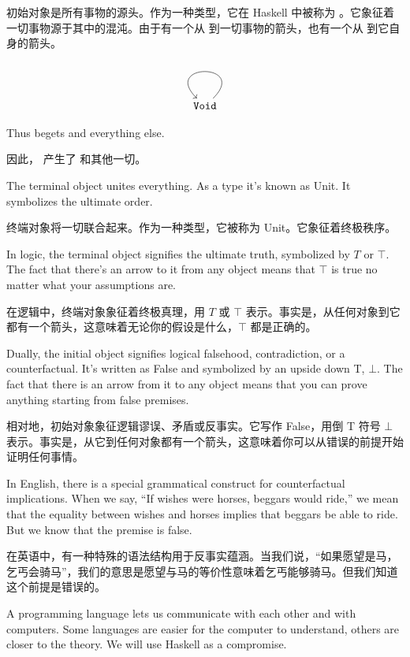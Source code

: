 \documentclass[DaoFP]{subfiles}
\begin{document}
 初始对象是所有事物的源头。作为一种类型，它在 Haskell 中被称为 。它象征着一切事物源于其中的混沌。由于有一个从  到一切事物的箭头，也有一个从  到它自身的箭头。

 \[
  \begin{tikzcd}
   \hask{Void}
   \arrow[loop]
  \end{tikzcd}
 \]

 Thus  begets  and everything else.

 因此， 产生了  和其他一切。

 The terminal object unites everything. As a type it's known as Unit. It symbolizes the ultimate order.

 终端对象将一切联合起来。作为一种类型，它被称为 Unit。它象征着终极秩序。

 In logic, the terminal object signifies the ultimate truth, symbolized by $T$ or $ \top$. The fact that there's an arrow to it from any object means that $ \top$ is true no matter what your assumptions are.

 在逻辑中，终端对象象征着终极真理，用 $T$ 或 $ \top$ 表示。事实是，从任何对象到它都有一个箭头，这意味着无论你的假设是什么，$ \top$ 都是正确的。

 Dually, the initial object signifies logical falsehood, contradiction, or a counterfactual. It's written as  False and symbolized by an upside down T, $ \bot$. The fact that there is an arrow from it to any object means that you can prove anything starting from false premises.

 相对地，初始对象象征逻辑谬误、矛盾或反事实。它写作 False，用倒 T 符号 $ \bot$ 表示。事实是，从它到任何对象都有一个箭头，这意味着你可以从错误的前提开始证明任何事情。

 In English, there is a special grammatical construct for counterfactual implications. When we say, ``If wishes were horses, beggars would ride,'' we mean that the equality between wishes and horses implies that beggars be able to ride. But we know that the premise is false.

 在英语中，有一种特殊的语法结构用于反事实蕴涵。当我们说，“如果愿望是马，乞丐会骑马”，我们的意思是愿望与马的等价性意味着乞丐能够骑马。但我们知道这个前提是错误的。

 A programming language lets us communicate with each other and with computers. Some languages are easier for the computer to understand, others are closer to the theory. We will use Haskell as a compromise.
\end{document}
